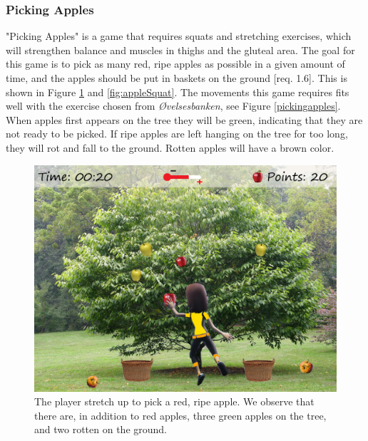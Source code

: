 \subsubsection{Picking Apples}
"Picking Apples" is a game that requires squats and stretching exercises, which will strengthen balance and muscles in thighs and the gluteal area. The goal for this game is to pick as many red, ripe apples as possible in a given amount of time, and the apples should be put in baskets on the ground [req. 1.6]. This is shown in Figure \ref{fig:appleStretch} and \ref{fig:appleSquat}. The movements this game requires fits well with the exercise chosen from \emph{Øvelsesbanken}, see Figure \ref{pickingapples}. When apples first appears on the tree they will be green, indicating that they are not ready to be picked. If ripe apples are left hanging on the tree for too long, they will rot and fall to the ground. Rotten apples will have a brown color. 

\begin{figure} [H]
\centering
\includegraphics[scale=0.1]{gameappletreeEng.jpg}
\caption[Picking apples - stretching]{The player stretch up to pick a red, ripe apple. We observe that there are, in addition to red apples, three green apples on the tree, and two rotten on the ground.}
\label{fig:appleStretch}
\end{figure}

